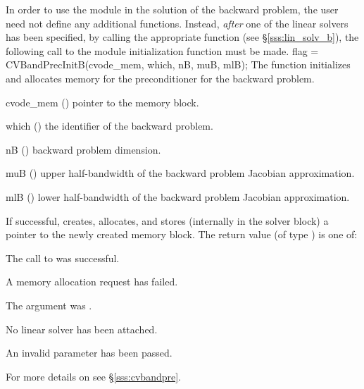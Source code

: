 In order to use the {\cvbandpre} module in the solution of the backward problem,
the user need not define any additional functions. 
Instead, {\em after} one of the {\cvspils} linear solvers has been specified,
by calling the appropriate function (see \S\ref{sss:lin_solv_b}), the following call
to the {\cvbandpre} module initialization function must be made.
{
  flag = CVBandPrecInitB(cvode\_mem, which, nB, muB, mlB);
}
{
  The function  initializes and allocates
  memory for the {\cvbandpre} preconditioner for the backward problem.
}
{
  \begin{args}
  \item[cvode\_mem] ()
    pointer to the {\cvodes} memory block.
  \item[which] ()
    the identifier of the backward problem.
  \item[nB] ()
    backward problem dimension.
  \item[muB] ()
    upper half-bandwidth of the backward problem Jacobian approximation.
  \item[mlB] ()
    lower half-bandwidth of the backward problem Jacobian approximation.
  \end{args}
}
{
  If successful,  creates, allocates, and stores (internally
  in the {\cvodes} solver block) a pointer to the newly created 
  {\cvbandpre} memory block.
  The return value  (of type ) is one of:
  \begin{args}
  \item[\Id{CVSPILS\_SUCCESS}]
    The call to  was successful.
  \item[\Id{CVSPILS\_MEM\_FAIL}]
    A memory allocation request has failed.
  \item[\Id{CVSPILS\_MEM\_NULL}]
    The  argument was .
  \item[\Id{CVSPILS\_LMEM\_NULL}]
    No linear solver has been attached.
  \item[\Id{CVSPILS\_ILL\_INPUT}]
    An invalid parameter has been passed.
  \end{args}
}
{}
For more details on {\cvbandpre} see \S\ref{sss:cvbandpre}.



